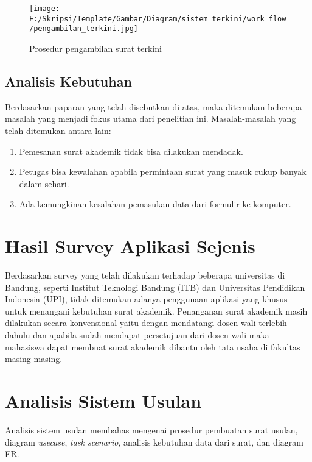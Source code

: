 \begin{figure}[H]
	\centering
		\texttt{[image: F:/Skripsi/Template/Gambar/Diagram/sistem\_terkini/work\_flow/pengambilan\_terkini.jpg]}
	{\caption{Prosedur pengambilan surat terkini}}
	\label{fig:pengambilan_terkini}
\end{figure}

\subsection{Analisis Kebutuhan}
\label{sec:analisis_kebutuhan}
Berdasarkan paparan yang telah disebutkan di atas, maka ditemukan beberapa masalah yang menjadi fokus utama dari penelitian ini. Masalah-masalah yang telah ditemukan antara lain:
\begin{enumerate}
	\item Pemesanan surat akademik tidak bisa dilakukan mendadak.
	\item Petugas bisa kewalahan apabila permintaan surat yang masuk cukup banyak dalam sehari.
	\item Ada kemungkinan kesalahan pemasukan data dari formulir ke komputer.
\end{enumerate}

\section{Hasil Survey Aplikasi Sejenis}
\label{sec:hasil_survey_aplikasi_sejenis}
Berdasarkan survey yang telah dilakukan terhadap beberapa universitas di Bandung, seperti Institut Teknologi Bandung (ITB) dan Universitas Pendidikan Indonesia (UPI), tidak ditemukan adanya penggunaan aplikasi yang khusus untuk menangani kebutuhan surat akademik. Penanganan surat akademik masih dilakukan secara konvensional yaitu dengan mendatangi dosen wali terlebih dahulu dan apabila sudah mendapat persetujuan dari dosen wali maka mahasiswa dapat membuat surat akademik dibantu oleh tata usaha di fakultas masing-masing.

\section{Analisis Sistem Usulan}
\label{sec:analisis_sistem_usulan}
Analisis sistem usulan membahas mengenai prosedur pembuatan surat usulan, diagram \textit{usecase}, \textit{task scenario}, analisis kebutuhan data dari surat, dan diagram ER. \\


